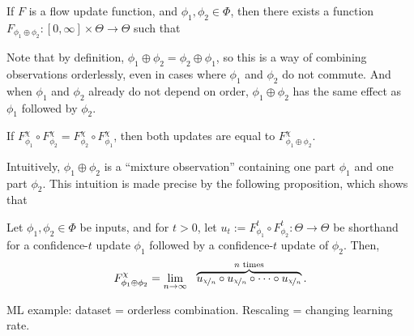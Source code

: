 \begin{prop}
	If $F$ is a flow update function, and $\phi_1, \phi_2 \in \Phi$, 
	then there exists a function 
	$F_{\phi_1 \oplus \phi_2} : [0, \infty] \times \Theta \to \Theta$
	such that
\end{prop}


Note that by definition, $\phi_1 \oplus \phi_2 = \phi_2 \oplus \phi_1$,
so this is a way of combining observations orderlessly, even in cases
where $\phi_1$ and $\phi_2$ do not commute. And when $\phi_1$ and $\phi_2$
already do not depend on order, $\phi_1\oplus \phi_2$ has the same effect
as $\phi_1$ followed by $\phi_2$.

\begin{prop}
	If $F^{\chi}_{\phi_1} \circ F^{\chi}_{\phi_2} =
	 	F^{\chi}_{\phi_2} \circ F^{\chi}_{\phi_1}$,
	then both updates are equal to $F^{\chi}_{\phi_1 \oplus \phi_2}$.
\end{prop}

Intuitively, $\phi_1 \oplus \phi_2$ is a ``mixture observation'' containing
one part $\phi_1$ and one part $\phi_2$. This intuition is made
precise by the following proposition,
which shows that 

\begin{prop}
	Let $\phi_1, \phi_2 \in \Phi$ be inputs, and for $t > 0$, let
	$u_t := F_{\phi_1}^t \circ F_{\phi_2}^t : \Theta \to \Theta$
 	be shorthand for 
	a confidence-$t$ update $\phi_1$ followed
	by a confidence-$t$ update of $\phi_2$. 
	Then,
	\[
		F_{\phi_1 \oplus \phi_2}^\chi = 
		\lim_{n \to \infty}~~
		\overbrace{u_{\nicefrac \chi n}\circ u_{\nicefrac \chi n} \circ\cdots\circ
			u_{\nicefrac \chi n}}^{\text{$n$ times}}
			.
	\]
\end{prop}

\begin{example}
	ML example: dataset = orderless combination.
	Rescaling = changing learning rate.

	\TODO
	
\end{example}


